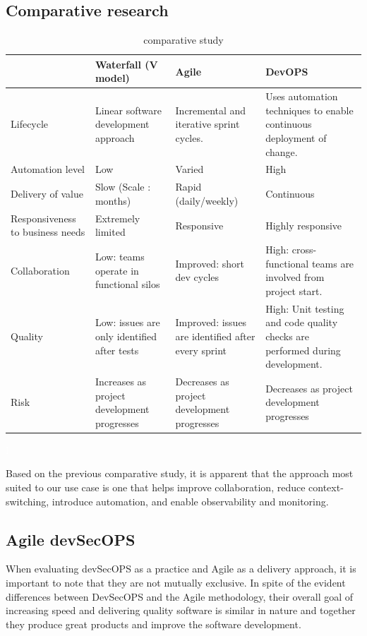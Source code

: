 \subsection{Comparative research }

\begin{table}[h!]
\center
\begin{tabular}[b]{|m{3cm}|m{4cm}|m{4cm}|m{4cm}|}
\hline
\rowcolor{white}
 & Waterfall (V model) 
 & Agile   & DevOPS  \\
\hline
 Lifecycle  
& Linear software development approach 
& Incremental and iterative sprint cycles. 
& Uses automation techniques to enable continuous deployment of change. \\
\hline
 Automation level  
& Low 
& Varied 
& High 
 \\
\hline
 Delivery of value 
& Slow (Scale : months) 
& Rapid (daily/weekly) 
& Continuous  \\
\hline
 Responsiveness to business needs 
& Extremely limited 
& Responsive 
& Highly responsive   \\
\hline
 Collaboration 
& Low: teams operate in functional silos 
& Improved: short dev cycles 
& High: cross-functional teams are involved from project start. \\
\hline
Quality 
& Low: issues are only identified after tests 
& Improved: issues are identified after every sprint 
& High: Unit testing and code quality checks are performed during development. \\
\hline
 Risk 
& Increases as project development progresses 
& Decreases as project development progresses 
& Decreases as project development progresses \\
\hline
\end{tabular}
\caption{ comparative study}
\textcolor{white}{I} \label{tab:tab-m}
\end{table}

Based on the previous comparative study, it is apparent that the approach most suited to our use case is one that helps improve collaboration, reduce context-switching, introduce automation, and enable observability and monitoring. 

\subsection{Agile devSecOPS }

When evaluating devSecOPS as a practice and Agile as a delivery approach, it is important to note that they are not mutually exclusive. In spite of the evident differences between DevSecOPS and the Agile methodology, their overall goal of increasing speed and delivering quality software is similar in nature and together they produce great products and improve the software development. 

